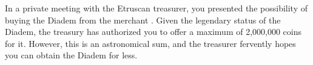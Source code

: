 \documentclass[green]{Kos}
\begin{document}
\name{\gScythiaDiadem{}}

In a private meeting with the Etruscan treasurer, you presented the possibility of buying the Diadem from the merchant \cMerchant{}. Given the legendary status of the Diadem, the treasury has authorized you to offer a maximum of 2,000,000 coins for it. However, this is an astronomical sum, and the treasurer fervently hopes you can obtain the Diadem for less.
\end{document}
